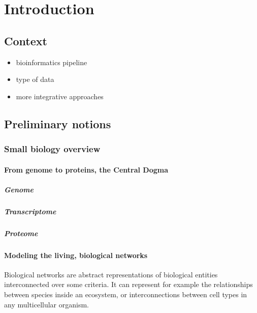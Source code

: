 \chapter{Introduction}

\section{Context}

	\begin{itemize}
		\item bioinformatics pipeline
		\item type of data
		\item more integrative approaches
	\end{itemize}

\section{Preliminary notions}

	\subsection{Small biology overview}

		\subsubsection{From genome to proteins, the Central Dogma}
			\paragraph{Genome}
			\paragraph{Transcriptome}
			\paragraph{Proteome}

		\subsubsection{Modeling the living, biological networks}
			Biological networks are abstract representations of biological entities interconnected over some criteria.
			It can represent for example the relationships between species inside an ecosystem, or interconnections between cell types in any multicellular organism.

